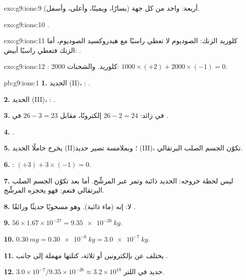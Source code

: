 \begin{solution}{exo:g9:ions:9}
أربعة: واحد من كل جهة (يسارًا، ويمينًا، وأعلى، وأسفل).
\end{solution}

\begin{solution}{exo:g9:ions:10}
.
\end{solution}

\begin{solution}{exo:g9:ions:11}
كلوريد الزنك:  الصوديوم لا تعطي راسبًا مع هيدروكسيد الصوديوم، أما
 الزنك فتعطي راسبًا أبيض:
.
\end{solution}

\begin{solution}{exo:g9:ions:12}
: 2000  كلوريد. والشحنات: $1000 \times (+2) + 2000 \times
(-1) = 0$.
\end{solution}

\begin{solution}{pb:g9:ions:1}
\textbf{1.} الحديد (II)، : .

\textbf{2.} الحديد (III)، : .

\textbf{3.} في   زائد: $26 - 2 = 24$ إلكترونًا، مقابل
$26 - 3 = 23$ في .

\textbf{4.} .

\textbf{5.} يخرج حاملًا  الحديد (II)؛ وبملامسة  تصير 
حديد (III)، تكوّن الجسم الصلب البرتقالي.

\textbf{6.} : $(+3) + 3 \times (-1) = 0$.

\textbf{7.} ليس لحظة خروجه:  الحديد ذائبة وتمر عبر المرشِّح. أما بعد
تكوّن الجسم الصلب البرتقالي فنعم: فهو  يحجزه
المرشِّح.

\textbf{8.} لا: إنه  (ماء  ذائبة). وهو مسحوبًا حديثًا ورائقًا
.

\textbf{9.} $56 \times 1.67 \times 10^{-27} = \qty{9.35e-26}{kg}$.

\textbf{10.} $\qty{0.30}{mg} = \qty{0.30e-6}{kg} = \qty{3.0e-7}{kg}$.

\textbf{11.} يختلف  عن  بإلكترونين أو ثلاثة، كتلتها مهملة إلى
جانب .

\textbf{12.} $3.0 \times 10^{-7} / 9.35 \times 10^{-26} \approx 3.2
\times 10^{18}$  حديد في اللتر.
\end{solution}
